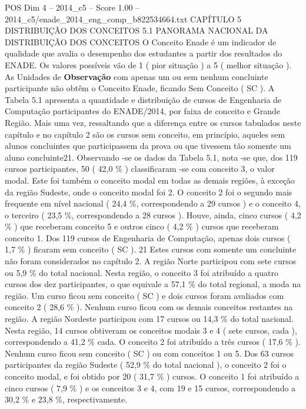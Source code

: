 \begin{textsample}{POS Dim 4 – 2014\_c5 – Score 1.00 – 2014\_c5/enade\_2014\_eng\_comp\_b822534664.txt}  \label{ex:f4_pos_160}
CAPÍTULO 5 DISTRIBUIÇÃO DOS CONCEITOS 5.1 PANORAMA NACIONAL DA DISTRIBUIÇÃO DOS CONCEITOS O Conceito Enade é um indicador de qualidade que avalia o desempenho dos estudantes a partir dos resultados do ENADE.
Os valores possíveis vão de 1 ( pior situação ) a 5 ( melhor situação ).
As Unidades de \textbf{Observação} com apenas um ou sem nenhum concluinte participante não obtêm o Conceito Enade, ficando Sem Conceito ( SC ).
A Tabela 5.1 apresenta a quantidade e distribuição de cursos de Engenharia de Computação participantes do ENADE/2014, por faixa de conceito e Grande Região.
Mais uma vez, ressaltando que a diferença entre os cursos tabulados neste capítulo e no capítulo 2 são os cursos sem conceito, em princípio, aqueles sem alunos concluintes que participassem da prova ou que tivessem tão somente um aluno concluinte21.
Observando -se os dados da Tabela 5.1, nota -se que, dos 119 cursos participantes, 50 ( 42,0 \% ) classificaram -se com conceito 3, o valor modal.
Este foi também o conceito modal em todas as demais regiões, à exceção da região Sudeste, onde o conceito modal foi 2.
O conceito 2 foi o segundo mais frequente em nível nacional ( 24,4 \%, correspondendo a 29 cursos ) e o conceito 4, o terceiro ( 23,5 \%, correspondendo a 28 cursos ).
Houve, ainda, cinco cursos ( 4,2 \% ) que receberam conceito 5 e outros cinco ( 4,2 \% ) cursos que receberam conceito 1.
Dos 119 cursos de Engenharia de Computação, apenas dois cursos ( 1,7 \% ) ficaram sem conceito ( SC ). 21 Estes cursos com somente um concluinte não foram considerados no capítulo 2.
A região Norte participou com sete cursos ou 5,9 \% do total nacional.
Nesta região, o conceito 3 foi atribuído a quatro cursos dos dez participantes, o que equivale a 57,1 \% do total regional, a moda na região.
Um curso ficou sem conceito ( SC ) e dois cursos foram avaliados com conceito 2 ( 28,6 \% ).
Nenhum curso ficou com os demais conceitos restantes na região.
A região Nordeste participou com 17 cursos ou 14,3 \% do total nacional.
Nesta região, 14 cursos obtiveram os conceitos modais 3 e 4 ( sete cursos, cada ), correspondendo a 41,2 \% cada.
O conceito 2 foi atribuído a três cursos ( 17,6 \% ).
Nenhum curso ficou sem conceito ( SC ) ou com conceitos 1 ou 5.
Dos 63 cursos participantes da região Sudeste ( 52,9 \% do total nacional ), o conceito 2 foi o conceito modal, e foi obtido por 20 ( 31,7 \% ) cursos.
O conceito 1 foi atribuído a cinco cursos ( 7,9 \% ) e os conceitos 3 e 4, com 19 e 15 cursos, correspondendo a 30,2 \% e 23,8 \%, respectivamente.

\end{textsample}
